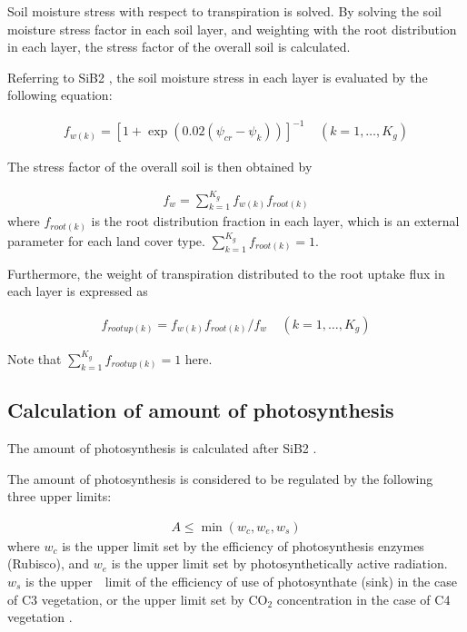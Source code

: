 Soil moisture stress with respect to transpiration is solved. By solving the soil moisture stress factor in each soil layer, and weighting with the root distribution in each layer, the stress factor
of the overall soil is calculated.

Referring to SiB2 \citep{Sellers1996-xi}, the soil moisture stress in each layer is evaluated by the following equation:

\begin{eqnarray}
 f_{w(k)} = [ 1 + \exp( 0.02 (\psi_{cr} - \psi_{k}) ) ]^{-1}
\ \ \ \ \ (k=1,\ldots,K_g)
\end{eqnarray}

The stress factor of the overall soil is then obtained by

\begin{eqnarray}
 f_w = \sum_{k=1}^{K_g} f_{w(k)} f_{root(k)}
\end{eqnarray} where \(f_{root(k)}\) is the root distribution fraction in each layer, which is an external parameter for each land cover type. \(\sum_{k=1}^{K_g} f_{root(k)}=1\).　

Furthermore, the weight of transpiration distributed to the root uptake flux in each layer is expressed as

\begin{eqnarray}
 f_{rootup(k)} = f_{w(k)} f_{root(k)} / f_w
\ \ \ \ \ (k=1,\ldots,K_g)
\end{eqnarray}

Note that \(\sum_{k=1}^{K_g} f_{rootup(k)} = 1\) here.

\subsection{Calculation of amount of photosynthesis}\label{calculation-of-amount-of-photosynthesis}

The amount of photosynthesis is calculated after SiB2 \citep{Sellers1996-xi}.

The amount of photosynthesis is considered to be regulated by the following three upper limits:

\begin{eqnarray}
 A \leq \min( w_c, w_e, w_s) \label{eq76}
\end{eqnarray} where \(w_c\) is the upper limit set by the efficiency of photosynthesis enzymes (Rubisco), and \(w_e\) is the upper limit set by photosynthetically active radiation. \(w_s\) is the upper　limit of
the efficiency of use of photosynthate (sink) in the case of C3 vegetation, or the upper limit set by \(\mathrm{CO_2}\) concentration in the case of C4 vegetation
\citep{Collatz1991-lz, Collatz1992-hc}.


